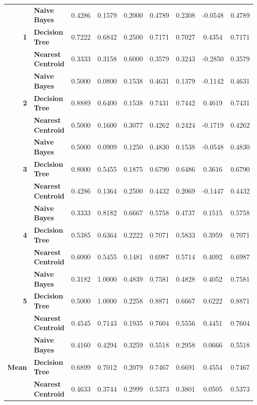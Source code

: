 \begin{center}
\begin{longtable}{ | r  l | c | c | c | c | c | c | c | }
\multirow{3}{*}{\textbf{1}} & \textbf{Naive Bayes} & 
0.4286 & 0.1579 & 0.2000 & 0.4789 & 0.2308 & -0.0548 & 0.4789 \\
& \textbf{Decision Tree} & 
0.7222 & 0.6842 & 0.2500 & 0.7171 & 0.7027 &  0.4354 & 0.7171 \\
& \textbf{Nearest Centroid} &
0.3333 & 0.3158 & 0.6000 & 0.3579 & 0.3243 & -0.2850 & 0.3579 \\
\hline
\multirow{3}{*}{\textbf{2}} & \textbf{Naive Bayes} & 
0.5000 & 0.0800 & 0.1538 & 0.4631 & 0.1379 & -0.1142 & 0.4631 \\
& \textbf{Decision Tree} & 
0.8889 & 0.6400 & 0.1538 & 0.7431 & 0.7442 &  0.4619 & 0.7431 \\
& \textbf{Nearest Centroid} &
0.5000 & 0.1600 & 0.3077 & 0.4262 & 0.2424 & -0.1719 & 0.4262 \\
\hline
\multirow{3}{*}{\textbf{3}} & \textbf{Naive Bayes} & 
0.5000 & 0.0909 & 0.1250 & 0.4830 & 0.1538 & -0.0548 & 0.4830 \\
& \textbf{Decision Tree} & 
0.8000 & 0.5455 & 0.1875 & 0.6790 & 0.6486 &  0.3616 & 0.6790 \\
& \textbf{Nearest Centroid} &
0.4286 & 0.1364 & 0.2500 & 0.4432 & 0.2069 & -0.1447 & 0.4432 \\
\hline
\multirow{3}{*}{\textbf{4}} & \textbf{Naive Bayes} & 
0.3333 & 0.8182 & 0.6667 & 0.5758 & 0.4737 &  0.1515 & 0.5758 \\
& \textbf{Decision Tree} & 
0.5385 & 0.6364 & 0.2222 & 0.7071 & 0.5833 &  0.3959 & 0.7071 \\
& \textbf{Nearest Centroid} &
0.6000 & 0.5455 & 0.1481 & 0.6987 & 0.5714 &  0.4092 & 0.6987 \\
\hline
\multirow{3}{*}{\textbf{5}} & \textbf{Naive Bayes} & 
0.3182 & 1.0000 & 0.4839 & 0.7581 & 0.4828 & 0.4052 & 0.7581 \\
& \textbf{Decision Tree} & 
0.5000 & 1.0000 & 0.2258 & 0.8871 & 0.6667 & 0.6222 & 0.8871 \\
& \textbf{Nearest Centroid} &
0.4545 & 0.7143 & 0.1935 & 0.7604 & 0.5556 & 0.4451 & 0.7604 \\
\hline
\multirow{3}{*}{\textbf{Mean}} & \textbf{Naive Bayes} & 
0.4160 & 0.4294 & 0.3259 & 0.5518 & 0.2958 & 0.0666 & 0.5518 \\
& \textbf{Decision Tree} & 
0.6899 & 0.7012 & 0.2079 & 0.7467 & 0.6691 & 0.4554 & 0.7467 \\
& \textbf{Nearest Centroid} &
0.4633 & 0.3744 & 0.2999 & 0.5373 & 0.3801 & 0.0505 & 0.5373 \\
\hline

\end{longtable}
\end{center}

